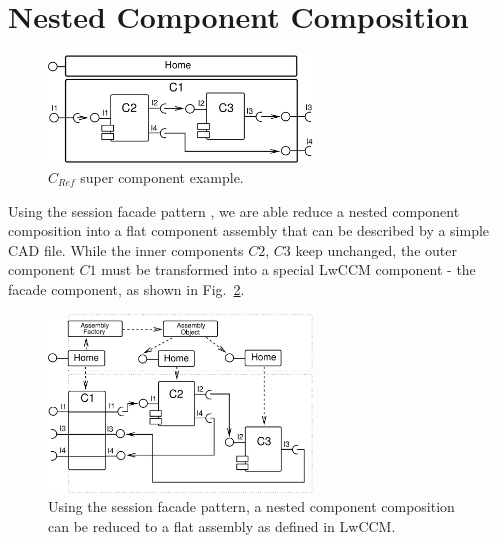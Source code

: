 \section{Nested Component Composition}
\label{NestedComponentComposition}


\begin{figure}[htb]
    \begin{center}
    \includegraphics [width=7cm,angle=0] {ComponentModel/figures/NestedAssembly}
    \caption{ $C_{Ref}$ super component example.}
    \label{NestedAssembly}
    \end{center}
\end{figure}

Using the session facade pattern \cite{J2EECorePatterns}, 
we are able reduce a nested component composition into a flat component 
assembly that can be described by a simple CAD file.
While the inner components $C2$, $C3$ keep unchanged, the outer component $C1$ 
must be transformed into a special LwCCM component - the facade component, 
as shown in Fig.~\ref{NestedToFlatAssembly}.

\begin{figure}[htb]
    \begin{center}
    \includegraphics [width=7cm,angle=0] {ComponentModel/figures/NestedToFlatAssembly}
    \caption{Using the session facade pattern, a nested component composition
    can be reduced to a flat assembly as defined in LwCCM.}
    \label{NestedToFlatAssembly}
    \end{center}
\end{figure}

